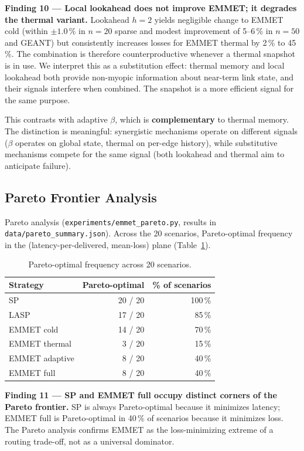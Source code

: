 \documentclass[11pt,a4paper]{article}
\begin{document}
\textbf{Finding 10 --- Local lookahead does not improve EMMET; it
degrades the thermal variant.} Lookahead $h{=}2$ yields negligible
change to EMMET cold (within $\pm 1.0\,\%$ in $n{=}20$ sparse and
modest improvement of 5--6\,\% in $n{=}50$ and GEANT) but consistently
increases losses for EMMET thermal by 2\,\% to 45\,\%. The combination
is therefore counterproductive whenever a thermal snapshot is in use.
We interpret this as a substitution effect: thermal memory and local
lookahead both provide non-myopic information about near-term link
state, and their signals interfere when combined. The snapshot is a
more efficient signal for the same purpose.

This contrasts with adaptive $\beta$, which is \textbf{complementary}
to thermal memory. The distinction is meaningful: synergistic
mechanisms operate on different signals ($\beta$ operates on global
state, thermal on per-edge history), while substitutive mechanisms
compete for the same signal (both lookahead and thermal aim to
anticipate failure).

\subsection{Pareto Frontier Analysis}

Pareto analysis (\texttt{experiments/emmet\_pareto.py}, results in
\texttt{data/pareto\_summary.json}). Across the 20 scenarios,
Pareto-optimal frequency in the (latency-per-delivered, mean-loss)
plane (Table~\ref{tab:pareto}).

\begin{table}[h]
\centering
\caption{Pareto-optimal frequency across 20 scenarios.}
\label{tab:pareto}
\begin{tabular}{lrr}
\toprule
Strategy        & Pareto-optimal & \% of scenarios \\
\midrule
SP              & 20 / 20        & 100\,\% \\
LASP            & 17 / 20        & 85\,\%  \\
EMMET cold      & 14 / 20        & 70\,\%  \\
EMMET thermal   & 3 / 20         & 15\,\%  \\
EMMET adaptive  & 8 / 20         & 40\,\%  \\
EMMET full      & 8 / 20         & 40\,\%  \\
\bottomrule
\end{tabular}
\end{table}

\textbf{Finding 11 --- SP and EMMET full occupy distinct corners of
the Pareto frontier.} SP is always Pareto-optimal because it minimizes
latency; EMMET full is Pareto-optimal in 40\,\% of scenarios because
it minimizes loss. The Pareto analysis confirms EMMET as the
loss-minimizing extreme of a routing trade-off, not as a universal
dominator.
\end{document}
